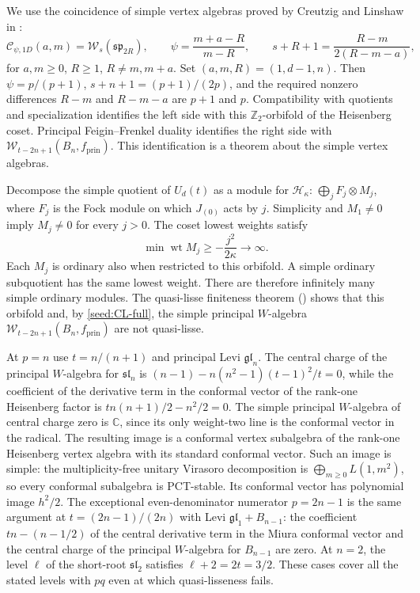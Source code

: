 \documentclass[11pt,a4paper]{amsart}
\numberwithin{equation}{section}
\theoremstyle{definition}
\theoremstyle{remark}
\newcommand{\C}{\mathbb C}
\newcommand{\spg}{\mathfrak{sp}}
\newcommand{\slg}{\mathfrak{sl}}
\newcommand{\glg}{\mathfrak{gl}}
\newcommand{\wt}{\operatorname{wt}}
\begin{document}
We use the coincidence of simple vertex algebras proved by Creutzig
and Linshaw in \cite[Theorem~B.2(6)]{CL}:
\begin{equation}\label{seed:CL-full}
 \mathcal C_{\psi,1D}(a,m)=\mathcal W_s(\spg_{2R}),\qquad
 \psi=\frac{m+a-R}{m-R},\qquad
 s+R+1=\frac{R-m}{2(R-m-a)},
\end{equation}
for $a,m\ge0$, $R\ge1$, $R\ne m,m+a$.
Set $(a,m,R)=(1,d-1,n)$. Then $\psi=p/(p+1)$,
$s+n+1=(p+1)/(2p)$, and the required nonzero differences $R-m$ and $R-m-a$ are $p+1$ and $p$.
Compatibility with quotients and specialization identifies the left side
with this $\mathbb Z_2$-orbifold of the Heisenberg coset. Principal Feigin--Frenkel duality identifies the
right side with $\mathcal W_{t-2n+1}(B_n,f_{\mathrm{prin}})$.
This identification is a theorem about the simple vertex algebras.

Decompose the simple quotient of $U_d(t)$ as a module for
$\mathcal H_\kappa$:
$\bigoplus_jF_j\otimes M_j$, where $F_j$ is the Fock module on
which $J_{(0)}$ acts by $j$.
Simplicity and $M_1\ne0$ imply $M_j\ne0$ for every $j>0$. The coset lowest weights satisfy
$$
 \min\wt M_j\ge-\frac{j^2}{2\kappa}\longrightarrow\infty.
$$
Each $M_j$ is ordinary also when restricted to this orbifold.
A simple ordinary subquotient has the same lowest weight. There are
therefore infinitely many simple ordinary modules. The quasi-lisse
finiteness theorem (\cite{AK}) shows that this orbifold and, by
\cref{seed:CL-full}, the simple principal $W$-algebra
$\mathcal W_{t-2n+1}(B_n,f_{\mathrm{prin}})$ are not quasi-lisse.

At $p=n$ use $t=n/(n+1)$ and principal Levi $\glg_n$.
The central charge of the principal $W$-algebra for $\slg_n$ is
$(n-1)-n(n^2-1)(t-1)^2/t=0$, while the coefficient of the derivative term in the conformal
vector of the rank-one Heisenberg factor is
$t n(n+1)/2-n^2/2=0$. The simple principal $W$-algebra of central charge zero is
$\C$, since its only weight-two line is the conformal vector in the radical.
The resulting image is a conformal vertex subalgebra of the rank-one
Heisenberg vertex algebra with its standard conformal vector. Such an image is simple: the multiplicity-free unitary
Virasoro decomposition is $\bigoplus_{m\ge0}L(1,m^2)$, so every
conformal subalgebra is PCT-stable. Its conformal vector has polynomial image
$h^2/2$. The exceptional even-denominator numerator $p=2n-1$ is the
same argument at $t=(2n-1)/(2n)$ with Levi $\glg_1+B_{n-1}$:
the coefficient $tn-(n-1/2)$ of the central derivative term
in the Miura conformal vector and the central charge
of the principal $W$-algebra for $B_{n-1}$ are zero.
At $n=2$, the level $\ell$ of the short-root $\slg_2$ satisfies
$\ell+2=2t=3/2$.
These cases cover all the stated levels with $pq$ even at which
quasi-lisseness fails.
\end{document}

